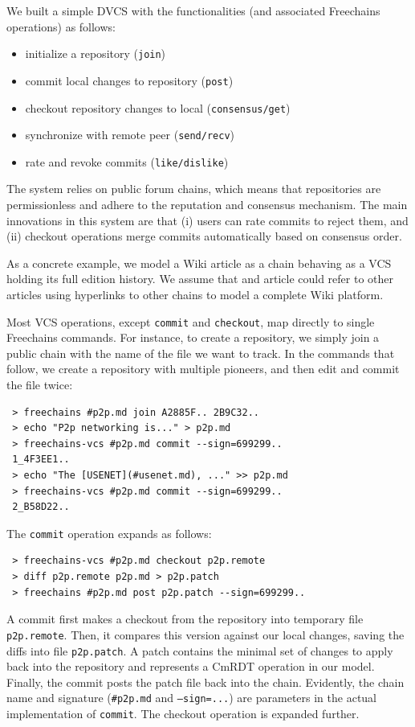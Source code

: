 \documentclass[10pt,journal,compsoc]{IEEEtran}
\newcommand{\FC}       {Freechains\xspace}
\newcommand{\code}[1]  {\texttt{\footnotesize{#1}}}
\begin{document}
We built a simple DVCS with the functionalities (and associated \FC
operations) as follows:
%
\begin{itemize}
    \setlength{\itemindent}{-8pt}
    \item initialize a repository (\code{join})
    \item commit local changes to repository (\code{post})
    \item checkout repository changes to local (\code{consensus/get})
    \item synchronize with remote peer (\code{send/recv})
    \item rate and revoke commits (\code{like/dislike})
\end{itemize}
%
The system relies on public forum chains, which means that repositories are
permissionless and adhere to the reputation and consensus mechanism.
The main innovations in this system are that
    (i)  users can rate commits to reject them, and
    (ii) checkout operations merge commits automatically based on consensus order.

As a concrete example, we model a Wiki article as a chain behaving as a VCS
holding its full edition history.
We assume that and article could refer to other articles using hyperlinks to
other chains to model a complete Wiki platform.

Most VCS operations, except \code{commit} and \code{checkout}, map directly to
single \FC commands.
For instance, to create a repository, we simply join a public chain with the
name of the file we want to track.
In the commands that follow, we create a repository with multiple pioneers, and
then edit and commit the file twice:

{\footnotesize
\begin{verbatim}
 > freechains #p2p.md join A2885F.. 2B9C32..
 > echo "P2p networking is..." > p2p.md
 > freechains-vcs #p2p.md commit --sign=699299..
 1_4F3EE1..
 > echo "The [USENET](#usenet.md), ..." >> p2p.md
 > freechains-vcs #p2p.md commit --sign=699299..
 2_B58D22..
\end{verbatim}
}

The \code{commit} operation expands as follows:

{\footnotesize
\begin{verbatim}
 > freechains-vcs #p2p.md checkout p2p.remote
 > diff p2p.remote p2p.md > p2p.patch
 > freechains #p2p.md post p2p.patch --sign=699299..
\end{verbatim}
}

A commit first makes a checkout from the repository into temporary file
\code{p2p.remote}.
Then, it compares this version against our local changes, saving the diffs
into file \code{p2p.patch}.
A patch contains the minimal set of changes to apply back into the repository
and represents a CmRDT operation in our model.
Finally, the commit posts the patch file back into the chain.
Evidently, the chain name and signature (\code{\#p2p.md} and \code{--sign=...})
are parameters in the actual implementation of \code{commit}.
The checkout operation is expanded further.
\end{document}
